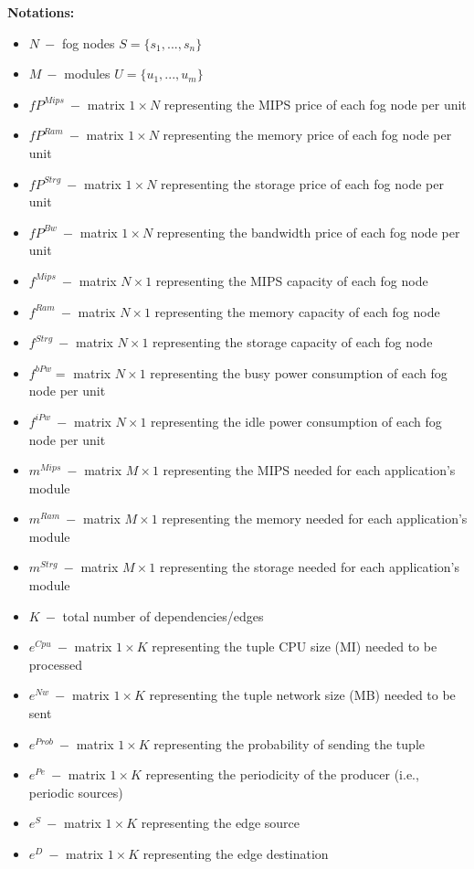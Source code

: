 \documentclass{article}
\begin{document}
\pagebreak
\noindent\textbf{Notations:}
\begin{itemize}
	\item $N~-$ fog nodes $S=\{s_1, ..., s_n\}$
	\item $M~-$ modules $U=\{u_1, ..., u_m\}$\\
	
	\item $fP^{Mips}~-$ matrix $1\times N$ representing the MIPS price of each fog node per unit
	\item $fP^{Ram}~-$ matrix $1\times N$ representing the memory price of each fog node per unit
	\item $fP^{Strg}~-$ matrix $1\times N$ representing the storage price of each fog node per unit
	\item $fP^{Bw}~-$ matrix $1\times N$ representing the bandwidth price of each fog node per unit\\
	
	\item $f^{Mips}~-$ matrix $N\times 1$ representing the MIPS capacity of each fog node
	\item $f^{Ram}~-$ matrix $N\times 1$ representing the memory capacity of each fog node
	\item $f^{Strg}~-$ matrix $N\times 1$ representing the storage capacity of each fog node
	\item $f^{bPw}=$ matrix $N\times 1$ representing the busy power consumption of each fog node per unit
	\item $f^{iPw}~-$ matrix $N\times 1$ representing the idle power consumption of each fog node per unit\\
	
	\item $m^{Mips}~-$ matrix $M\times 1$ representing the MIPS needed for each application's module
	\item $m^{Ram}~-$ matrix $M\times 1$ representing the memory needed for each application's module
	\item $m^{Strg}~-$ matrix $M\times 1$ representing the storage needed for each application's module\\
	
	\item $K~-$ total number of dependencies/edges
	\item $e^{Cpu}~-$ matrix $1\times K$ representing the tuple CPU size (MI) needed to be processed
	\item $e^{Nw}~-$ matrix $1\times K$ representing the tuple network size (MB) needed to be sent
	\item $e^{Prob}~-$ matrix $1\times K$ representing the probability of sending the tuple
	\item $e^{Pe}~-$ matrix $1\times K$ representing the periodicity of the producer (i.e., periodic sources)
	\item $e^{S}~-$ matrix $1\times K$ representing the edge source
	\item $e^{D}~-$ matrix $1\times K$ representing the edge destination\\
	

\end{itemize}
\end{document}
